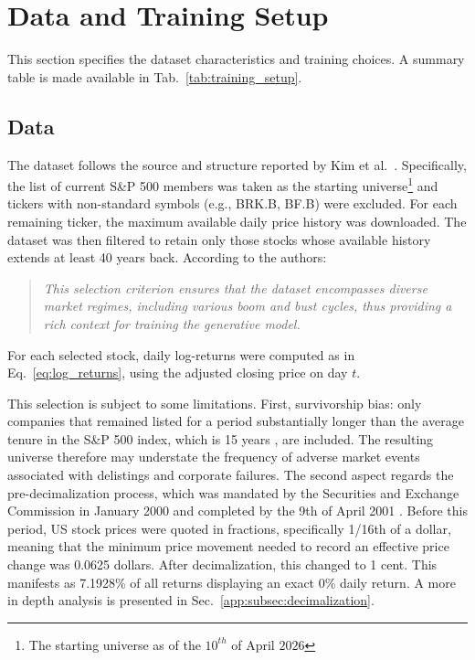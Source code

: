 \chapter{Data and Training Setup}
\label{ch:data_setup}
This section specifies the dataset characteristics and training choices. A summary table is made available in Tab.\ \ref{tab:training_setup}. 
\section{Data}
\label{sec:ch4_data}
The dataset follows the source and structure reported by Kim et al.\ \cite{kim2025diffusion}.
Specifically, the list of current S\&P 500 members was taken as the starting universe\footnote{The starting universe as of the \(10^{th}\) of April \(2026\)} and
tickers with non-standard symbols (e.g., BRK.B, BF.B) were excluded. For each remaining
ticker, the maximum available daily price history was downloaded. The dataset was then
filtered to retain only those stocks whose available history extends at least 40 years back.
According to the authors:
\begin{quote}
    \emph{This selection criterion ensures that the dataset encompasses diverse market
    regimes, including various boom and bust cycles, thus providing a rich context for
    training the generative model.}
\end{quote}
For each selected stock, daily log-returns were computed as in Eq.\ \ref{eq:log_returns},
using the adjusted closing price on day \(t\).

This selection is subject to some limitations. First, survivorship bias: only companies that remained listed for a
period substantially longer than the average tenure in the S\&P 500 index, which is 15 years \cite{slok_apollo_longevity}, are included. The resulting universe therefore may understate the frequency of adverse market events associated with delistings
and corporate failures. The second aspect regards the pre-decimalization process, which was mandated by the Securities and Exchange Commission in January 2000 and completed by the 9th of April 2001 \cite{furfine2003decimalization}. Before this period, US stock prices were quoted in fractions, specifically 1/16th of a dollar, meaning that the minimum price movement needed to record an effective price change was 0.0625 dollars. After decimalization, this changed to 1 cent. This manifests as 7.1928\% of all returns displaying an exact 0\% daily return. A more in depth analysis is presented in Sec.\ \ref{app:subsec:decimalization}.

